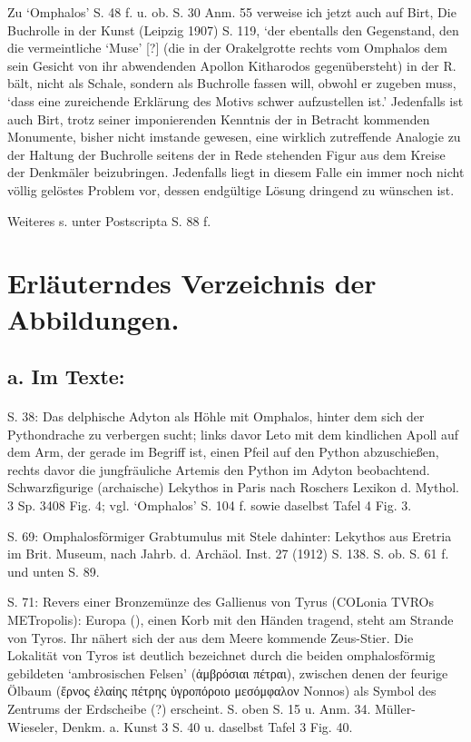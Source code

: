\documentclass[a4paper, 11pt, oneside]{article}
\newcommand*\svgAAR{}
\begin{document}
Zu `Omphalos' S. 48 f. u. ob. S. 30 Anm. 55 verweise ich jetzt auch auf Birt, Die Buchrolle in der Kunst (Leipzig 1907) S. 119, `der ebentalls den Gegenstand, den die vermeintliche `Muse' [?] (die in der Orakelgrotte rechts vom Omphalos dem sein Gesicht von ihr abwendenden Apollon Kitharodos gegenübersteht) in der R. bält, nicht als Schale, sondern als Buchrolle fassen will, obwohl er zugeben muss, `dass eine zureichende Erklärung des Motivs schwer aufzustellen ist.' Jedenfalls ist auch Birt, trotz seiner imponierenden Kenntnis der in Betracht kommenden Monumente, bisher nicht imstande gewesen, eine wirklich zutreffende Analogie zu der Haltung der Buchrolle seitens der in Rede stehenden Figur aus dem Kreise der Denkmäler beizubringen. Jedenfalls liegt in diesem Falle ein immer noch nicht völlig gelöstes Problem vor, dessen endgültige Lösung dringend zu wünschen ist.

Weiteres s. unter Postscripta S. 88 f.
\clearpage
\section{Erläuterndes Verzeichnis der Abbildungen.}
\subsection{a. Im Texte:}
\paragraph{}
S. 38: Das delphische Adyton als Höhle mit Omphalos, hinter dem sich der Pythondrache zu verbergen sucht; links davor Leto mit dem kindlichen Apoll auf dem Arm, der gerade im Begriff ist, einen Pfeil auf den Python abzuschießen, rechts davor die jungfräuliche Artemis den Python im Adyton beobachtend. Schwarzfigurige (archaische) Lekythos in Paris nach Roschers Lexikon d. Mythol. 3 Sp. 3408 Fig. 4; vgl. `Omphalos' S. 104 f. sowie daselbst Tafel 4 Fig. 3.

S. 69: Omphalosförmiger Grabtumulus mit Stele dahinter: Lekythos aus Eretria im Brit. Museum, nach Jahrb. d. Archäol. Inst. 27 (1912) S. 138. S. ob. S. 61 f. und unten S. 89.

S. 71: Revers einer Bronzemünze des Gallienus von Tyrus (COLonia TVROs METropolis): Europa ($\svgAAR$), einen Korb mit den Händen tragend, steht am Strande von Tyros. Ihr nähert sich der aus dem Meere kommende Zeus-Stier. Die Lokalität von Tyros ist deutlich bezeichnet durch die beiden omphalosförmig gebildeten `ambrosischen Felsen' (ἀμβρόσιαι πέτραι), zwischen denen der feurige Ölbaum (ἔρνος ἐλαίης πέτρης ὑγροπόροιο μεσόμφαλον Nonnos) als Symbol des Zentrums der Erdscheibe (?) erscheint. S. oben S. 15 u. Anm. 34. Müller-Wieseler, Denkm. a. Kunst 3 S. 40 u. daselbst Tafel 3 Fig. 40.
\end{document}
